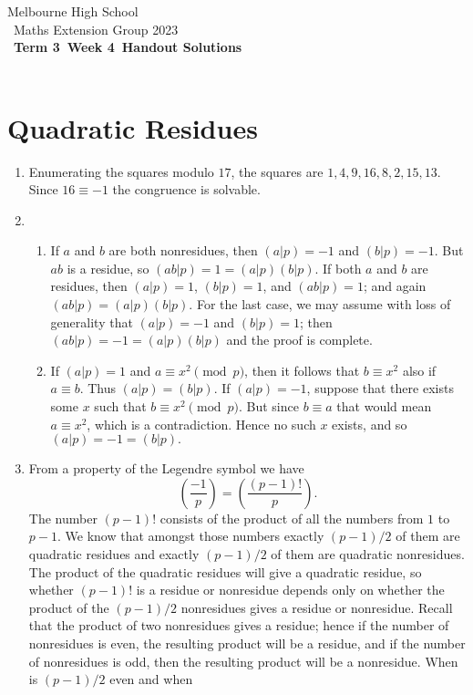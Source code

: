 \documentclass[a4paper]{article}
\title{{\thepdftitle}}
\author{Nathan Wong\and Tom Yan}
\date{2023}
\newcommand{\theterm}{3}
\newcommand{\theweek}{4}
\newcommand{\thedisplaytitle}{Term \theterm\ Week \theweek\ Handout Solutions}
\newcommand{\leg}[2]{\left(\frac{#1}{#2}\right)}
\newcommand{\ileg}[2]{(#1|#2)}
\begin{document}
\noindent Melbourne High School\\\
\noindent Maths Extension Group 2023\\\
\noindent \textbf{\thedisplaytitle}\\\
\section*{Quadratic Residues}
\begin{enumerate}
\item Enumerating the squares modulo \(17\), the squares are \(1,4,9,16,8,2,15,13.\)
Since \(16\equiv-1\) the congruence is solvable.
\item 
\begin{enumerate}
\item If \(a\) and \(b\) are both nonresidues, then \(\ileg{a}{p}=-1\) and \(\ileg{b}{p}=-1\).
But \(ab\) is a residue, so \(\ileg{ab}{p}=1=\ileg{a}{p}\ileg{b}{p}\). If both \(a\) and \(b\)
are residues, then \(\ileg{a}{p}=1\), \(\ileg{b}{p}=1\), and \(\ileg{ab}{p}=1\); and again
\(\ileg{ab}{p}=\ileg{a}{p}\ileg{b}{p}.\) For the last case, we may assume with loss of generality
that \(\ileg{a}{p}=-1\) and \(\ileg{b}{p}=1\); then \(\ileg{ab}{p}=-1=\ileg{a}{p}\ileg{b}{p}\) and
the proof is complete.
\item If \(\ileg{a}{p}=1\) and \(a\equiv x^2\pmod{p}\), then it follows that \(b\equiv x^2\) also
if \(a\equiv b\). Thus \(\ileg{a}{p}=\ileg{b}{p}\). If \(\ileg{a}{p}=-1\), suppose that there exists
some \(x\) such that \(b\equiv x^2\pmod{p}\). But since \(b\equiv a\) that would mean \(a\equiv x^2\),
which is a contradiction. Hence no such \(x\) exists, and so \(\ileg{a}{p}=-1=\ileg{b}{p}.\)
\end{enumerate}
\item From a property of the Legendre symbol we have
\[
\leg{-1}{p}=\leg{(p-1)!}{p}.
\]
The number \((p-1)!\) consists of the product of all the numbers from \(1\) to \(p-1\). We know
that amongst those numbers exactly \((p-1)/2\) of them are quadratic residues and exactly
\((p-1)/2\) of them are quadratic nonresidues. The product of the quadratic residues will
give a quadratic residue, so whether \((p-1)!\) is a residue or nonresidue depends only
on whether the product of the \((p-1)/2\) nonresidues gives a residue or nonresidue. Recall
that the product of two nonresidues gives a residue; hence if the number of nonresidues
is even, the resulting product will be a residue, and if the number of nonresidues is odd,
then the resulting product will be a nonresidue. When is \((p-1)/2\) even and when

\end{enumerate}
\end{document}
